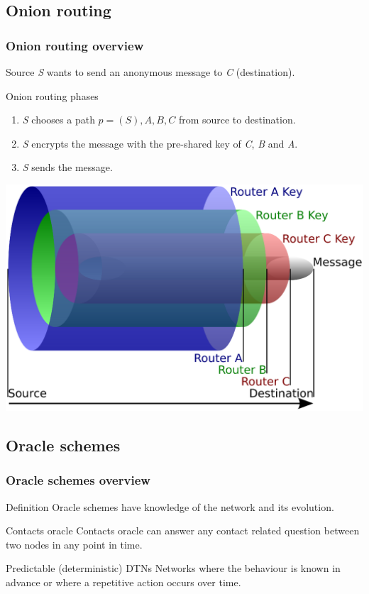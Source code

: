 \documentclass[compress,red]{beamer}
\begin{document}
\subsection{Onion routing}
\begin{frame}
\frametitle{Onion routing overview}
Source \textit{S} wants to send an anonymous message to \textit{C} (destination).
\bigskip
\begin{block}{Onion routing phases}
\begin{enumerate}
\item \textit{S} chooses a path $p=(S),A,B,C$ from source to destination.
\item \textit{S} encrypts the message with the pre-shared key of \textit{C}, \textit{B} and \textit{A}.
\item \textit{S} sends the message.
\end{enumerate}
\end{block}
\bigskip
\centering \includegraphics[width=.5\linewidth]{../paper/imgs/onion}
\end{frame}

\subsection{Oracle schemes}
\begin{frame}
\frametitle{Oracle schemes overview}
\begin{block}{Definition}
Oracle schemes have knowledge of the network and its evolution.
\end{block}
\bigskip
\begin{block}{Contacts oracle}
Contacts oracle can answer any contact related question between two nodes in any point in time.
\end{block}
\bigskip
\begin{block}{Predictable (deterministic) DTNs}
Networks where the behaviour is known in advance or where a repetitive action occurs over time.
\end{block}
\end{frame}
\end{document}
